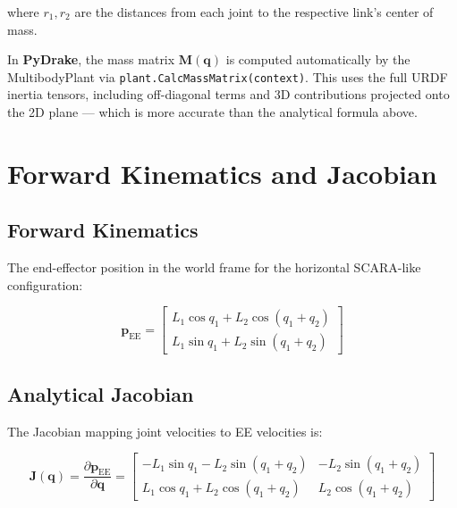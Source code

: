 \documentclass[11pt,a4paper]{article}
\newcommand{\bq}{\bm{q}}
\newcommand{\bM}{\bm{M}}
\newcommand{\bJ}{\bm{J}}
\begin{document}
where $r_1, r_2$ are the distances from each joint to the respective link's center of mass.

\begin{warnbox}
In \textbf{PyDrake}, the mass matrix $\bM(\bq)$ is computed automatically by the MultibodyPlant via \texttt{plant.CalcMassMatrix(context)}. This uses the full URDF inertia tensors, including off-diagonal terms and 3D contributions projected onto the 2D plane --- which is more accurate than the analytical formula above.
\end{warnbox}

\section{Forward Kinematics and Jacobian}
\label{sec:fk_jac}

\subsection{Forward Kinematics}

The end-effector position in the world frame for the horizontal SCARA-like configuration:

\begin{equation}
\boxed{
\bm{p}_{\mathrm{EE}} = \begin{bmatrix}
    L_1 \cos q_1 + L_2 \cos(q_1 + q_2) \\
    L_1 \sin q_1 + L_2 \sin(q_1 + q_2)
\end{bmatrix}
}
\label{eq:fk}
\end{equation}

\subsection{Analytical Jacobian}

The Jacobian mapping joint velocities to EE velocities is:

\begin{equation}
\bJ(\bq) = \frac{\partial \bm{p}_{\mathrm{EE}}}{\partial \bq}
= \begin{bmatrix}
    -L_1 \sin q_1 - L_2 \sin(q_1 + q_2) & -L_2 \sin(q_1 + q_2) \\
     L_1 \cos q_1 + L_2 \cos(q_1 + q_2)  &  L_2 \cos(q_1 + q_2)
\end{bmatrix}
\label{eq:jacobian}
\end{equation}
\end{document}
